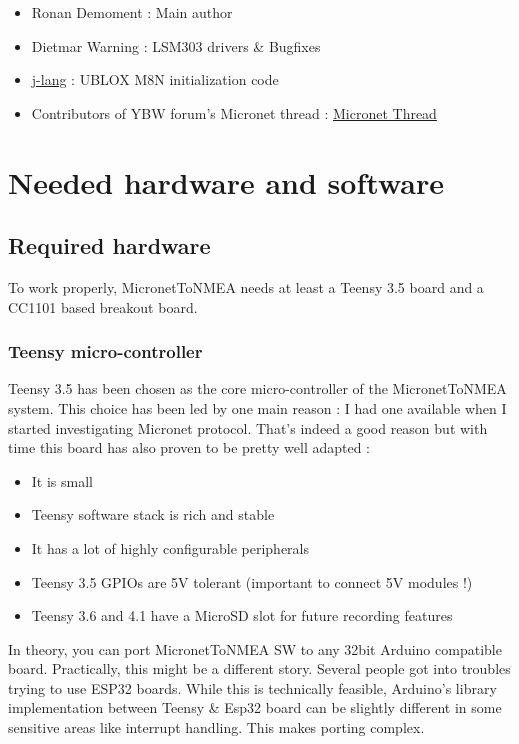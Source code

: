 \documentclass{report}
\begin{document}
\begin{itemize}
\item Ronan Demoment : Main author
\item Dietmar Warning : LSM303 drivers \& Bugfixes
\item \href{https://github.com/j-lang}{j-lang} : UBLOX M8N initialization code
\item Contributors of YBW forum's Micronet thread : \href{https://forums.ybw.com/index.php?threads/raymarines-Micronet.539500/}{Micronet Thread}
\end{itemize}

\chapter{Needed hardware and software}

\section{Required hardware}

To work properly, MicronetToNMEA needs at least a Teensy 3.5 board and a CC1101 based breakout board.

\subsection{Teensy micro-controller}
Teensy 3.5 has been chosen as the core micro-controller of the MicronetToNMEA system. This choice has been led by one main reason : I had one available when I started investigating Micronet protocol. That's indeed a good reason but with time this board has also proven to be pretty well adapted :

\begin{itemize}
	\item It is small
	\item Teensy software stack is rich and stable
	\item It has a lot of highly configurable peripherals
	\item Teensy 3.5 GPIOs are 5V tolerant (important to connect 5V modules !)
	\item Teensy 3.6 and 4.1 have a MicroSD slot for future recording features
\end{itemize}

In theory, you can port MicronetToNMEA SW to any 32bit Arduino compatible board. Practically, this might be a different story. Several people got into troubles trying to use ESP32 boards. While this is technically feasible, Arduino's library implementation between Teensy \& Esp32 board can be slightly different in some sensitive areas like interrupt handling. This makes porting complex.
\end{document}
